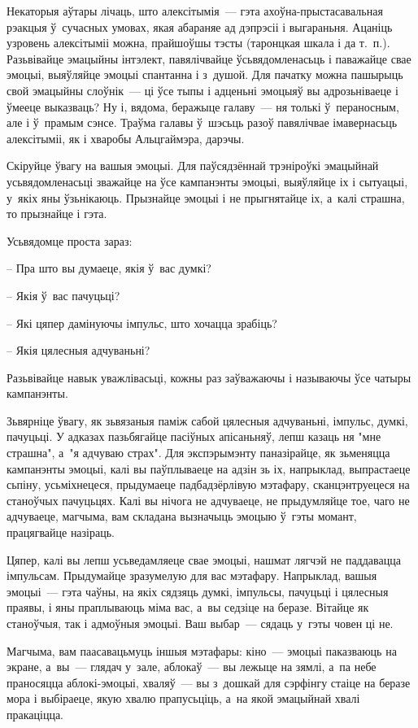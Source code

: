 Некаторыя аўтары лічаць, што алексітымія~--- гэта ахоўна-прыстасавальная рэакцыя ў~сучасных умовах, якая абараняе ад дэпрэсіі і выгараньня. Ацаніць узровень алексітыміі можна, прайшоўшы тэсты (таронцкая шкала і да т.~п.). Разьвівайце эмацыйны інтэлект, павялічвайце ўсьвядомленасьць і паважайце свае эмоцыі, выяўляйце эмоцыі спантанна і з~душой. Для пачатку можна пашырыць свой эмацыйны слоўнік~--- ці ўсе тыпы і адценьні эмоцыяў вы адрозьніваеце і ўмееце выказваць? Ну і, вядома, беражыце галаву~--- ня толькі ў~пераносным, але і ў~прамым сэнсе. Траўма галавы ў~шэсьць разоў павялічвае імавернасьць алексітыміі, як і хваробы Альцгаймэра, дарэчы.

Скіруйце ўвагу на вашыя эмоцыі. Для паўсядзённай трэніроўкі эмацыйнай усьвядомленасьці зважайце на ўсе кампанэнты эмоцыі, выяўляйце іх і сытуацыі, у~якіх яны ўзьнікаюць. Прызнайце эмоцыі і не прыгнятайце іх, а~калі страшна, то прызнайце і гэта.

Усьвядомце проста зараз: 

– Пра што вы думаеце, якія ў~вас думкі?

– Якія ў~вас пачуцьці?

– Які цяпер дамінуючы імпульс, што хочацца зрабіць?

– Якія цялесныя адчуваньні?

Разьвівайце навык уважлівасьці, кожны раз заўважаючы і называючы ўсе чатыры кампанэнты.

Зьвярніце ўвагу, як зьвязаныя паміж сабой цялесныя адчуваньні, імпульс, думкі, пачуцьці. У адказах пазьбягайце пасіўных апісаньняў, лепш казаць ня "мне страшна", а~"я адчуваю страх". Для экспэрымэнту паназірайце, як зьменяцца кампанэнты эмоцыі, калі вы паўплываеце на адзін зь іх, напрыклад, выпрастаеце сьпіну, усьміхнецеся, прыдумаеце падбадзёрлівую мэтафару, сканцэнтруецеся на станоўчых пачуцьцях. Калі вы нічога не адчуваеце, не прыдумляйце тое, чаго не адчуваеце, магчыма, вам складана вызначыць эмоцыю ў~гэты момант, працягвайце назіраць.

Цяпер, калі вы лепш усьведамляеце свае эмоцыі, нашмат лягчэй не паддавацца імпульсам. Прыдумайце зразумелую для вас мэтафару. Напрыклад, вашыя эмоцыі~--- гэта чаўны, на якіх сядзяць думкі, імпульсы, пачуцьці і цялесныя праявы, і яны праплываюць міма вас, а~вы седзіце на беразе. Вітайце як станоўчыя, так і адмоўныя эмоцыі. Ваш выбар~--- сядаць у~гэты човен ці не.

Магчыма, вам паасавацьмуць іншыя мэтафары: кіно~--- эмоцыі паказваюць на экране, а~вы~--- глядач у~зале, аблокаў~--- вы лежыце на зямлі, а~па небе праносяцца аблокі-эмоцыі, хваляў~--- вы з~дошкай для сэрфінгу стаіце на беразе мора і выбіраеце, якую хвалю прапусьціць, а~на якой эмацыйнай хвалі пракаціцца.

